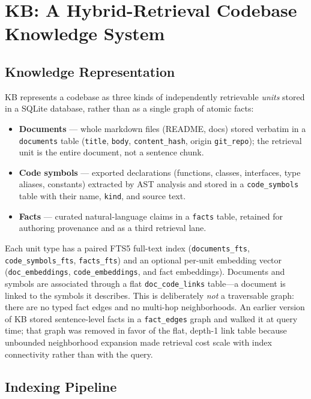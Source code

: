 \section{KB: A Hybrid-Retrieval Codebase Knowledge System}
\label{sec:system}

\subsection{Knowledge Representation}

KB represents a codebase as three kinds of independently retrievable
\emph{units} stored in a SQLite database, rather than as a single graph of
atomic facts:
\begin{itemize}
  \item \textbf{Documents} --- whole markdown files (README, docs) stored
    verbatim in a \texttt{documents} table (\texttt{title}, \texttt{body},
    \texttt{content\_hash}, origin \texttt{git\_repo}); the retrieval unit is the
    entire document, not a sentence chunk.
  \item \textbf{Code symbols} --- exported declarations (functions, classes,
    interfaces, type aliases, constants) extracted by AST analysis and stored in
    a \texttt{code\_symbols} table with their name, \texttt{kind}, and source
    text.
  \item \textbf{Facts} --- curated natural-language claims in a \texttt{facts}
    table, retained for authoring provenance and as a third retrieval lane.
\end{itemize}

Each unit type has a paired FTS5 full-text index
(\texttt{documents\_fts}, \texttt{code\_symbols\_fts}, \texttt{facts\_fts}) and
an optional per-unit embedding vector (\texttt{doc\_embeddings},
\texttt{code\_embeddings}, and fact embeddings).  Documents and symbols are
associated through a flat \texttt{doc\_code\_links} table---a document is linked
to the symbols it describes.  This is deliberately \emph{not} a traversable
graph: there are no typed fact edges and no multi-hop neighborhoods.  An earlier
version of KB stored sentence-level facts in a \texttt{fact\_edges} graph and
walked it at query time; that graph was removed in favor of the flat,
depth-1 link table because unbounded neighborhood expansion made retrieval cost
scale with index connectivity rather than with the query.

\subsection{Indexing Pipeline}

